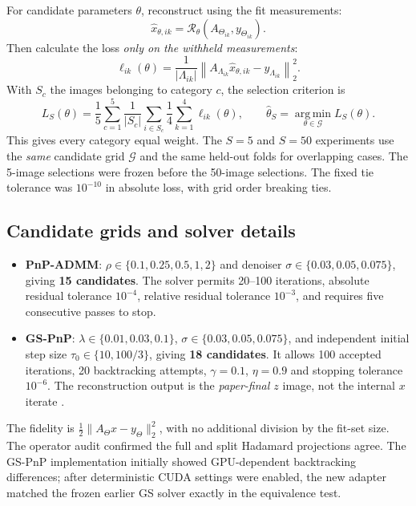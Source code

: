 \documentclass[a4paper,10pt]{article}
\begin{document}
For candidate parameters $\theta$, reconstruct using the fit measurements:
\begin{equation}
 \widehat x_{\theta,ik}=\mathcal{R}_{\theta}(A_{\Theta_{ik}},y_{\Theta_{ik}}).
\end{equation}
Then calculate the loss \emph{only on the withheld measurements}:
\begin{equation}
 \ell_{ik}(\theta)=\frac{1}{|\Lambda_{ik}|}\left\|A_{\Lambda_{ik}}\widehat x_{\theta,ik}-y_{\Lambda_{ik}}\right\|_2^2.
\end{equation}
With $S_c$ the images belonging to category $c$, the selection criterion is
\begin{equation}
 \boxed{\displaystyle
 L_S(\theta)=\frac15\sum_{c=1}^{5}\frac1{|S_c|}\sum_{i\in S_c}\frac14\sum_{k=1}^{4}\ell_{ik}(\theta),\qquad
 \widehat\theta_S=\operatorname*{arg\,min}_{\theta\in\mathcal G}L_S(\theta).}
 \label{eq:ssdu}
\end{equation}
This gives every category equal weight. The $S=5$ and $S=50$ experiments use the \emph{same} candidate grid $\mathcal G$ and the same held-out folds for overlapping cases. The 5-image selections were frozen before the 50-image selections. The fixed tie tolerance was $10^{-10}$ in absolute loss, with grid order breaking ties.

\subsection*{Candidate grids and solver details}

\begin{itemize}
\item \textbf{PnP-ADMM}: $\rho\in\{0.1,0.25,0.5,1,2\}$ and denoiser $\sigma\in\{0.03,0.05,0.075\}$, giving \textbf{15 candidates}. The solver permits 20--100 iterations, absolute residual tolerance $10^{-4}$, relative residual tolerance $10^{-3}$, and requires five consecutive passes to stop.
\item \textbf{GS-PnP}: $\lambda\in\{0.01,0.03,0.1\}$, $\sigma\in\{0.03,0.05,0.075\}$, and independent initial step size $\tau_0\in\{10,100/3\}$, giving \textbf{18 candidates}. It allows 100 accepted iterations, 20 backtracking attempts, $\gamma=0.1$, $\eta=0.9$ and stopping tolerance $10^{-6}$. The reconstruction output is the \emph{paper-final $z$} image, not the internal $x$ iterate \cite{hurault2022}.
\end{itemize}

The fidelity is $\frac12\|A_{\Theta}x-y_{\Theta}\|_2^2$, with no additional division by the fit-set size. The operator audit confirmed the full and split Hadamard projections agree. The GS-PnP implementation initially showed GPU-dependent backtracking differences; after deterministic CUDA settings were enabled, the new adapter matched the frozen earlier GS solver exactly in the equivalence test.
\end{document}

